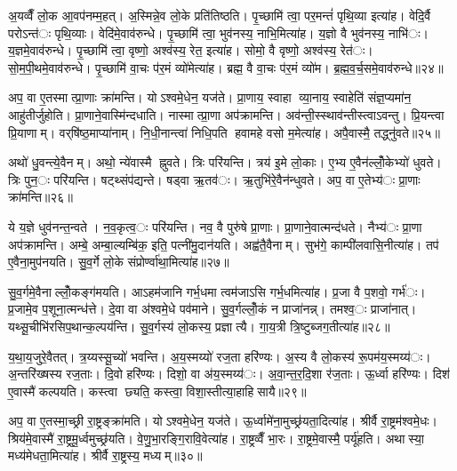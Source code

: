 अ॒यव्वैँ लो॒क आ॒वप॑नम्म॒हत्। अ॒स्मिन्ने॒व लो॒के प्रति॑तिष्ठति। पृ॒च्छामि॑ त्वा॒ पर॒मन्तं॑ पृथि॒व्या इत्या॑ह। वेदि॒र्वै परोऽन्त॑ः पृथि॒व्याः। वेदि॑मे॒वाव॑रुन्धे। पृ॒च्छामि॑ त्वा॒ भुव॑नस्य॒ नाभि॒मित्या॑ह। य॒ज्ञो वै भुव॑नस्य॒ नाभि॑ः। य॒ज्ञमे॒वाव॑रुन्धे। पृ॒च्छामि॑ त्वा॒ वृष्णो॒ अश्व॑स्य॒ रेत॒ इत्या॑ह। सोमो॒ वै वृष्णो॒ अश्व॑स्य॒ रेत॑ः। सो॒म॒पी॒थमे॒वाव॑रुन्धे। पृ॒च्छामि॑ वा॒चः प॑र॒मं व्यो॑मेत्या॑ह। ब्रह्म॒ वै वा॒चः प॑र॒मं व्यो॑म। ब्र॒ह्म॒व॒र्च॒समे॒वाव॑रुन्धे॥२४॥


अप॒ वा ए॒तस्मात्प्रा॒णाः क्रा॑मन्ति। योऽश्वमे॒धेन॒ यज॑ते। प्रा॒णाय॒ स्वाहा व्या॒नाय॒ स्वाहेति॑ संज्ञ॒प्यमा॑न॒ आहु॑तीर्जुहोति। प्रा॒णाने॒वास्मि॑न्दधाति। नास्मात्प्रा॒णा अप॑क्रामन्ति। अव॑न्ती॒स्स्थाव॑न्तीस्त्वाऽवन्तु। प्रि॒यन्त्वा प्रि॒याणाम्। वर्‌षि॑ष्ठ॒माप्या॑नाम्। नि॒धी॒नान्त्वा॑ निधि॒पति हवामहे वसो म॒मेत्या॑ह। अपै॒वास्मै॒ तद्ध्नु॑वते॥२५॥

अथो॑ धु॒वन्त्ये॒वैनम्। अथो॒ न्ये॑वास्मै ह्नुवते। त्रिः परि॑यन्ति। त्रय॑ इ॒मे लो॒काः। ए॒भ्य ए॒वैन॑ल्लोँ॒केभ्यो॑ धुवते। त्रिः पुन॒ः परि॑यन्ति। षट्थ्संप॑द्यन्ते। षड्वा ऋ॒तव॑ः। ऋ॒तुभि॑रे॒वैन॑न्धुवते। अप॒ वा ए॒तेभ्य॑ः प्रा॒णाः क्रा॑मन्ति॥२६॥

ये य॒ज्ञे धुव॑नन्त॒न्वते। न॒व॒कृत्व॒ः परि॑यन्ति। नव॒ वै पुरु॑षे प्रा॒णाः। प्रा॒णाने॒वात्मन्द॑धते। नैभ्य॑ः प्रा॒णा अप॑क्रामन्ति। अम्बे॒ अम्बा॒ल्यम्बि॑क॒ इति॒ पत्नी॑मु॒दान॑यति। अह्व॑तै॒वैनाम्। सुभ॑गे॒ काम्पी॑लवासि॒नीत्या॑ह। तप॑ ए॒वैना॒मुप॑नयति। सु॒व॒र्गे लो॒के संप्रोर्ण्वा॑था॒मित्या॑ह॥२७॥

सु॒व॒र्गमे॒वैनाल्लोँ॒कङ्ग॑मयति। आऽहम॑जानि गर्भ॒धमा त्वम॑जाऽसि गर्भ॒धमित्या॑ह। प्र॒जा वै प॒शवो॒ गर्भ॑ः। प्र॒जामे॒व प॒शूना॒त्मन्ध॑त्ते। दे॒वा वा अ॑श्वमे॒धे पव॑माने। सु॒व॒र्गल्लोँ॒कं न प्राजा॑नन्न्। तमश्व॒ः प्राजा॑नात्। यथ्सू॒चीभि॑रसिप॒थान्क॒ल्पय॑न्ति। सु॒व॒र्गस्य॑ लो॒कस्य॒ प्रज्ञात्यै। गा॒य॒त्री त्रि॒ष्टुब्जग॒तीत्या॑ह॥२८॥

य॒था॒य॒जुरे॒वैतत्। त्र॒य्यस्सू॒च्यो॑ भवन्ति। अ॒य॒स्मय्यो॑ रज॒ता हरि॑ण्यः। अ॒स्य वै लो॒कस्य॑ रू॒पम॑य॒स्मय्य॑ः। अ॒न्तरि॑ख्षस्य रज॒ताः। दि॒वो हरि॑ण्यः। दिशो॒ वा अ॑य॒स्मय्य॑ः। अ॒वा॒न्त॒र॒दि॒शा र॑ज॒ताः। ऊ॒र्ध्वा हरि॑ण्यः। दिश॑ ए॒वास्मै॑ कल्पयति। कस्त्वा छ्यति॒ कस्त्वा॒ विशा॒स्तीत्या॒हाहिसायै॥२९॥


अप॒ वा ए॒तस्मा॒च्छ्री रा॒ष्ट्रङ्क्रा॑मति। योऽश्वमे॒धेन॒ यज॑ते। ऊ॒र्ध्वामे॑ना॒मुच्छ्र॑यता॒दित्या॑ह। श्रीर्वै रा॒ष्ट्रम॑श्वमे॒धः। श्रिय॑मे॒वास्मै॑ रा॒ष्ट्रमू॒र्ध्वमुच्छ्र॑यति। वे॒णु॒भा॒रङ्गि॒रावि॒वेत्या॑ह। रा॒ष्ट्रव्वैँ भा॒रः। रा॒ष्ट्रमे॒वास्मै॒ पर्यू॑हति। अथास्या॒ मध्य॑मेधता॒मित्या॑ह। श्रीर्वै रा॒ष्ट्रस्य॒ मध्यम्॥३०॥

